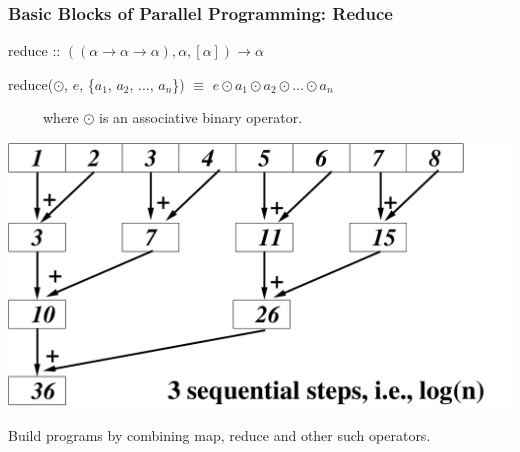 \documentclass{beamer}
\renewcommand{\emph}[1]{\textcolor{structure}{#1}}
\newcommand{\emp}[1]{\textcolor{DikuRed}{ #1}}
\begin{document}
\begin{frame}[fragile,t]
   \frametitle{Basic Blocks of Parallel Programming: Reduce}

\bigskip

\emp{reduce} :: $((\alpha \rightarrow \alpha \rightarrow \alpha), \alpha, [\alpha]) \rightarrow \alpha$

\smallskip

\emp{reduce}($\odot$, $e$, \{$a_1$, $a_2$, ..., $a_n$\}) $\equiv$ \emph{$e \odot a_1 \odot a_2 \odot ... \odot a_n$}

\smallskip

~~~~~where $\odot$ is an associative binary operator.

\bigskip

\begin{center} 
        \includegraphics[height=25ex]{Figures/ReduceEg.pdf} 
\end{center} 

Build programs by combining \emp{map}, \emp{reduce} and other such operators. %

\end{frame}
\end{document}
